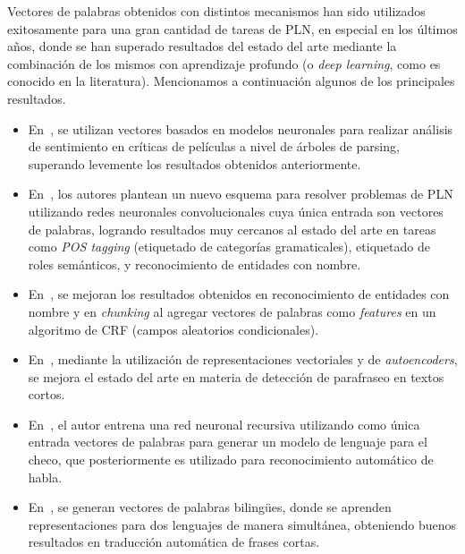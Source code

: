 Vectores de palabras obtenidos con distintos mecanismos han sido utilizados exitosamente para una
gran cantidad de tareas de PLN, en especial en los últimos años, donde se han superado resultados
del estado del arte mediante la combinación de los mismos con aprendizaje profundo (o \textit{deep
learning}, como es conocido en la literatura). Mencionamos a continuación algunos de los principales
resultados.

\begin{itemize}

\item En~\cite{Socher2011a, Socher2013a}, se utilizan vectores basados en modelos neuronales para
realizar análisis de sentimiento en críticas de películas a nivel de árboles de parsing, superando
levemente los resultados obtenidos anteriormente.

\item En~\cite{CollobertWeston2008, CollobertWeston2011}, los autores plantean un nuevo esquema para
resolver problemas de PLN utilizando redes neuronales convolucionales cuya única entrada son
vectores de palabras, logrando resultados muy cercanos al estado del arte en tareas como \textit{POS
tagging} (etiquetado de categorías gramaticales), etiquetado de roles semánticos, y reconocimiento
de entidades con nombre.

\item En~\cite{Turian2010}, se mejoran los resultados obtenidos en reconocimiento de entidades con
nombre y en \textit{chunking} al agregar vectores de palabras como \textit{features} en un algoritmo
de CRF (campos aleatorios condicionales).

\item En~\cite{Socher2011b}, mediante la utilización de representaciones vectoriales y de
\textit{autoencoders}, se mejora el estado del arte en materia de detección de parafraseo en textos
cortos.

\item En~\cite{Mikolov2007}, el autor entrena una red neuronal recursiva utilizando como única
entrada vectores de palabras para generar un modelo de lenguaje para el checo, que posteriormente es
utilizado para reconocimiento automático de habla.

\item En~\cite{Socher2013b}, se generan vectores de palabras bilingües, donde se aprenden
representaciones para dos lenguajes de manera simultánea, obteniendo buenos resultados en traducción
automática de frases cortas.

\end{itemize}


